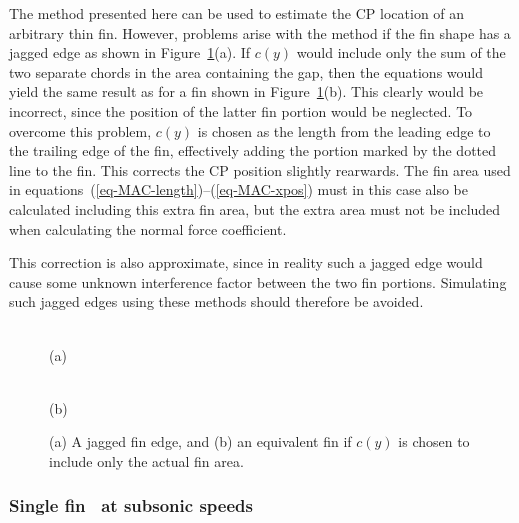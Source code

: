 The method presented here can be used to estimate the CP location of
an arbitrary thin fin.  However, problems arise with the method if the
fin shape has a jagged edge as shown in
Figure~\ref{fig-fin-jagged}(a).  If $c(y)$ would include only the sum
of the two separate chords in the area containing the gap, then the
equations would yield the same result as for a fin shown in
Figure~\ref{fig-fin-jagged}(b).  This clearly would be incorrect,
since the position of the latter fin portion would be neglected.  To
overcome this problem, $c(y)$ is chosen as the length from the leading
edge to the trailing edge of the fin, effectively adding the portion
marked by the dotted line to the fin.  This corrects the CP position
slightly rearwards.  The fin area used in
equations~(\ref{eq-MAC-length})--(\ref{eq-MAC-xpos}) must in this case
also be calculated including this extra fin area, but the extra area
must not be included when calculating the normal force coefficient.

This correction is also approximate, since in reality such a jagged
edge would cause some unknown interference factor between the two fin
portions.  Simulating such jagged edges using these methods should
therefore be avoided.


\begin{figure}
\centering
\parbox{35mm}{\centering
{} \\ (a)}
\hspace{5mm}
\parbox{35mm}{\centering
{} \\ (b)}
\caption{(a) A jagged fin edge, and (b) an equivalent fin if $c(y)$ is
  chosen to include only the actual fin area.}
\label{fig-fin-jagged}
\end{figure}







\subsubsection{Single fin \CNa\ at subsonic speeds}
\label{sec-average-angle}

